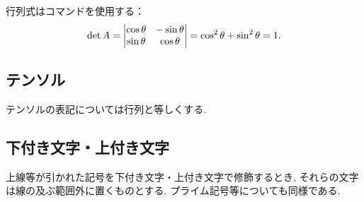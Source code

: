 \documentclass[uplatex,a4j,twocolumn]{jsarticle}
\begin{document}
		行列式はコマンドを使用する：
		\begin{equation}
			\det{A} = \begin{vmatrix} \cos{\theta} & -\sin{\theta} \\ \sin{\theta} & \cos{\theta} \end{vmatrix} = \cos^2{\theta} + \sin^2{\theta} = 1.
		\end{equation}
	\subsection{テンソル}
		テンソルの表記については行列と等しくする.
	\subsection{下付き文字・上付き文字}
		上線等が引かれた記号を下付き文字・上付き文字で修飾するとき, それらの文字は線の及ぶ範囲外に置くものとする. プライム記号等についても同様である. 

\balance
\end{document}
